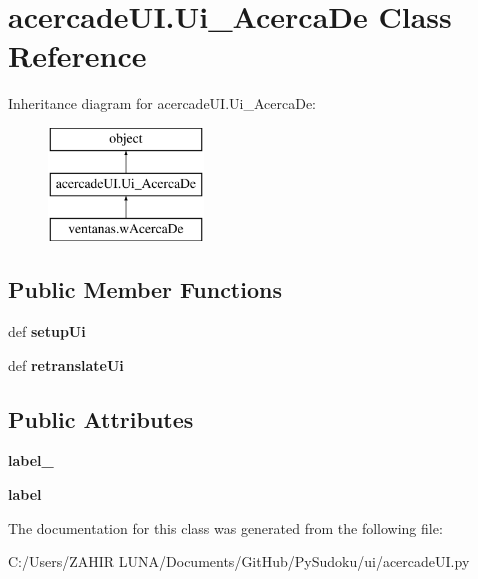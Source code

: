 \hypertarget{classacercade_u_i_1_1_ui___acerca_de}{\section{acercade\-U\-I.\-Ui\-\_\-\-Acerca\-De Class Reference}
\label{classacercade_u_i_1_1_ui___acerca_de}
}
Inheritance diagram for acercade\-U\-I.\-Ui\-\_\-\-Acerca\-De\-:\begin{figure}[H]
\begin{center}
\leavevmode
\includegraphics[height=3.000000cm]{classacercade_u_i_1_1_ui___acerca_de}
\end{center}
\end{figure}
\subsection*{Public Member Functions}
\begin{DoxyCompactItemize}
\item 
\hypertarget{classacercade_u_i_1_1_ui___acerca_de_aefd67a324d3a0f1b22deb4dc4e4a440d}{def {\bfseries setup\-Ui}}\label{classacercade_u_i_1_1_ui___acerca_de_aefd67a324d3a0f1b22deb4dc4e4a440d}

\item 
\hypertarget{classacercade_u_i_1_1_ui___acerca_de_a470228c7638375668f956cd52ac985ff}{def {\bfseries retranslate\-Ui}}\label{classacercade_u_i_1_1_ui___acerca_de_a470228c7638375668f956cd52ac985ff}

\end{DoxyCompactItemize}
\subsection*{Public Attributes}
\begin{DoxyCompactItemize}
\item 
\hypertarget{classacercade_u_i_1_1_ui___acerca_de_a867506749372d38d091f6f45ac68cdf5}{{\bfseries label\-\_}}\label{classacercade_u_i_1_1_ui___acerca_de_a867506749372d38d091f6f45ac68cdf5}

\item 
\hypertarget{classacercade_u_i_1_1_ui___acerca_de_abb0b29b87b4861d692b65d2e6234b579}{{\bfseries label}}\label{classacercade_u_i_1_1_ui___acerca_de_abb0b29b87b4861d692b65d2e6234b579}

\end{DoxyCompactItemize}


The documentation for this class was generated from the following file\-:\begin{DoxyCompactItemize}
\item 
C\-:/\-Users/\-Z\-A\-H\-I\-R  L\-U\-N\-A/\-Documents/\-Git\-Hub/\-Py\-Sudoku/ui/acercade\-U\-I.\-py\end{DoxyCompactItemize}

